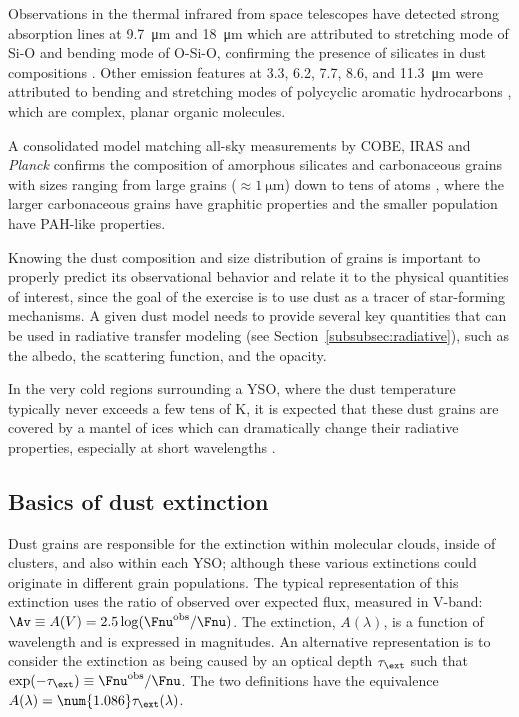 Observations in the thermal infrared from space telescopes have detected strong absorption lines at \SI{9.7}{\micro\meter} and \SI{18}{\micro\meter} which are attributed to stretching mode of Si-O and bending mode of O-Si-O, confirming the presence of silicates in dust compositions \citep{Weingartner:2001du}. Other emission features at 3.3, 6.2, 7.7, 8.6, and \SI{11.3}{\micro\meter} \citep{Sellgren:1994vz} were attributed to bending and stretching modes of polycyclic aromatic hydrocarbons \citep[PAH, see][]{Gillett:1973bh,Allamandola:1985cf}, which are complex, planar organic molecules.
 
A consolidated model matching all-sky measurements by COBE, IRAS and \textit{Planck} confirms the composition of amorphous silicates and carbonaceous grains with sizes ranging from large grains ($\approx\SI{1}{\micro\meter}$) down to tens of atoms \citep{Collaboration:2016kp}, where the larger carbonaceous grains have graphitic properties and the smaller population have PAH-like properties.






Knowing the dust composition and size distribution of grains is important to properly predict its observational behavior and relate it to the physical quantities of interest, since the goal of the exercise is to use dust as a tracer of star-forming mechanisms. A given dust model needs to provide several key quantities that can be used in radiative transfer modeling (see Section~\ref{subsubsec:radiative}), such as the albedo, the scattering function, and the opacity.

In the very cold regions surrounding a YSO, where the dust temperature typically never exceeds a few tens of \si{\kelvin}, it is expected that these dust grains are covered by a mantel of ices which can dramatically change their radiative properties, especially at short wavelengths \citep[e.g][]{Ossenkopf:1994tq}. 

\subsection{Basics of dust extinction}
\label{subsec:DustExtinction}

Dust grains are responsible for the extinction within molecular clouds, inside of clusters, and also within each YSO; although these various extinctions could originate in different grain populations. The typical representation of this extinction uses the ratio of observed over expected flux, measured in V-band: $\Av \equiv A(V) = 2.5\log(\Fnu^\textrm{obs}/\Fnu)$. The extinction, $A(\lambda)$, is a function of wavelength and is expressed in magnitudes. An alternative representation is to consider the extinction as being caused by an optical depth $\tau_\ext$ such that $\exp(-\tau_\ext) \equiv \Fnu^\textrm{obs}/\Fnu$. The two definitions have the equivalence $A(\lambda) = \num{1.086}\tau_\ext(\lambda)$.

